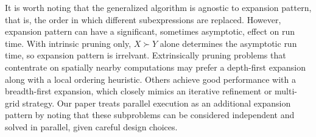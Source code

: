 \documentclass[twoside,leqno,twocolumn]{article}
\newcommand{\otimeshat}{\widehat{\otimes}}
\newcommand{\odothat}{\widehat{\odot}}
\newcommand{\prefsplit}[2]{#1 \succ #2}
\newcommand{\summary}{\hat{\sigma}}
\newcommand{\gnp}{\psi}
\newcommand{\kdroot}[1]{#1^{\text{root}}}
\newcommand{\outstat}{\sigma}
\begin{document}


It is worth noting that the generalized algorithm is agnostic to expansion pattern, that is, the order in which different subexpressions are replaced.
However, expansion pattern can have a significant, sometimes asymptotic, effect on run time.
With intrinsic pruning only, $\prefsplit{X}{Y}$ alone determines the asymptotic run time, so expansion pattern is irrelvant.
Extrinsically pruning problems that contentrate on spatially nearby computations may prefer a depth-first expansion along with a local ordering heuristic.
Others achieve good performance with a breadth-first expansion, which closely mimics an iterative refinement or multi-grid strategy.
Our paper treats parallel execution as an additional expansion pattern by noting that these subproblems can be considered independent and solved in parallel, given careful design choices.

\end{document}
